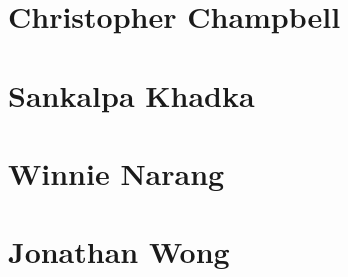 \section{Christopher Champbell}

\section{Sankalpa Khadka}

\section{Winnie Narang}

\section{Jonathan Wong}

